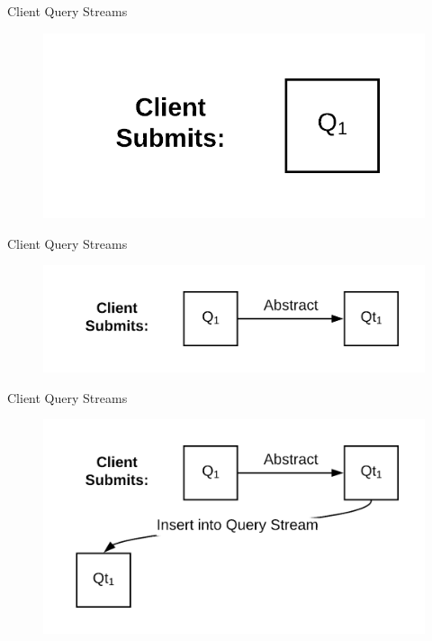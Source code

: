 \documentclass[10pt]{beamer}
\begin{document}
\begin{frame}[fragile]{Client Query Streams}
    \begin{figure}
        \includegraphics[scale=0.2]{apollo_client_query_stream_0}
    \end{figure}
\end{frame}

\begin{frame}[fragile]{Client Query Streams}
    \begin{figure}
        \includegraphics[scale=0.2]{apollo_client_query_stream_0_2}
    \end{figure}

\end{frame}

\begin{frame}[fragile]{Client Query Streams}
    \begin{figure}
        \includegraphics[scale=0.2]{apollo_client_query_stream_0_3}
    \end{figure}
\end{frame}
\end{document}
